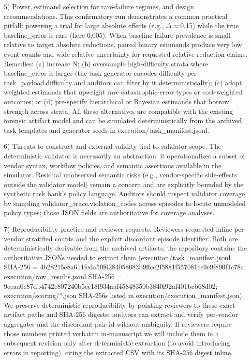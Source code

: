 \documentclass[conference]{IEEEtran}
\begin{document}
5) Power, estimand selection for rare-failure regimes, and design recommendations. This confirmatory run demonstrates a common practical pitfall: powering a trial for large absolute effects (e.g., \ensuremath{\Delta}\ensuremath{\approx}0.15) while the true baseline\_error is rare (here 0.005). When baseline failure prevalence is small relative to target absolute reductions, paired binary estimands produce very low event counts and wide relative uncertainty for requested relative-reduction claims. Remedies: (a) increase N; (b) oversample high-difficulty strata where baseline\_error is larger (the task generator encodes difficulty per task\_payload.difficulty and auditors can filter by it deterministically); (c) adopt weighted estimands that upweight rare catastrophic-error types or cost-weighted outcomes; or (d) pre-specify hierarchical or Bayesian estimands that borrow strength across strata. All these alternatives are compatible with the existing forensic artifact model and can be simulated deterministically from the archived task templates and generator seeds in execution/task\_manifest.jsonl.

6) Threats to construct and external validity tied to validator scope. The deterministic validator is necessarily an abstraction: it operationalizes a subset of vendor syntax, workflow policies, and semantic assertions available in the simulator. Residual unobserved semantic risks (e.g., vendor‑specific side-effects outside the validator model) remain a concern and are explicitly bounded by the synthetic task bank's policy language. Auditors should inspect validator coverage by sampling validator\_trace.violation\_codes across episodes to locate unmodeled policy types; those JSON fields are authoritative for coverage analyses.

7) Reproducibility practice and reviewer requests. Reviewers requested inline per-vendor stratified counts and the explicit discordant episode identifier. Both are deterministically derivable from the archived artifacts; the repository contains the authoritative JSONs needed to extract them (execution/task\_manifest.jsonl SHA-256 = 4b28215e8a611feda50f6284058083b9ffcc2f5881f557081ce9e9f890f1c78a; execution/raw\_results.jsonl SHA-256 = 9eeaa0c87db4742c807240b5ee18f934aaf45848350b3840f92af401bcb68d02; execution/scoring/*.json SHA-256s listed in execution/execution\_manifest.json). We preserve deterministic reproducibility by pointing reviewers to these exact artifact paths and SHA-256 digests; auditors can extract and verify per-vendor aggregates and the discordant-pair id without ambiguity. If reviewers require those numbers printed verbatim in‑manuscript we will include them in a subsequent revision only after deterministic extraction (to avoid introducing errors in reporting), citing the extracted CSV with its SHA-256 digest inline.
\end{document}
